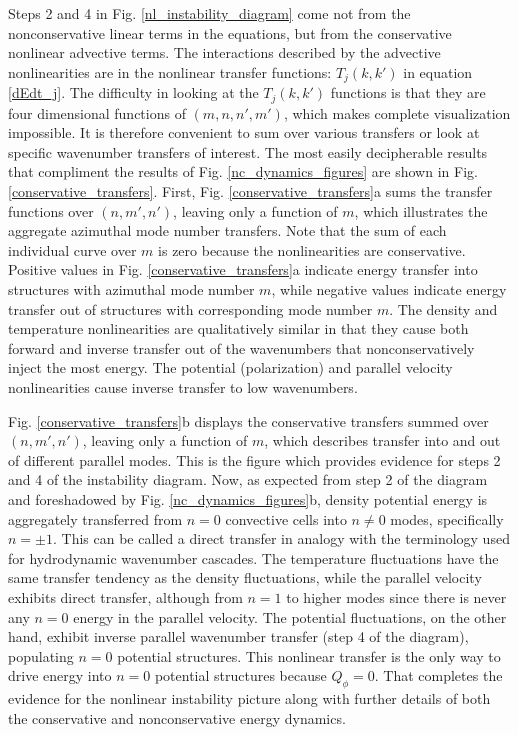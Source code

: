 \documentclass[showpacs,preprintnumbers,amsmath,amssymb,superscriptaddress]{revtex4}
\begin{document}
Steps 2 and 4 in Fig. \ref{nl_instability_diagram} come not from the nonconservative linear terms in the equations, but from the conservative nonlinear advective terms.
The interactions described by the advective nonlinearities are in the nonlinear transfer functions: $T_{j}(k,k')$ in equation \ref{dEdt_j}.
The difficulty in looking at the $T_{j}(k,k')$ functions is that they are four dimensional functions of $(m,n,n',m')$, 
which makes complete visualization impossible. It is therefore convenient to sum over various transfers or look at specific wavenumber transfers of interest. The most easily decipherable
results that compliment the results of Fig. \ref{nc_dynamics_figures} are shown in Fig. \ref{conservative_transfers}. First, Fig. \ref{conservative_transfers}a sums the transfer functions over
$(n,m',n')$, leaving only a function of $m$, which illustrates the aggregate azimuthal mode
number transfers. Note that the sum of each individual curve over $m$ is zero because the nonlinearities are conservative. Positive values in Fig. \ref{conservative_transfers}a
indicate energy transfer into structures with azimuthal mode number $m$, while negative values indicate energy transfer out of structures with corresponding mode number $m$. 
The density and temperature nonlinearities
are qualitatively similar in that they cause both forward and inverse transfer out of the wavenumbers that nonconservatively inject the most energy. The potential (polarization) and parallel velocity 
nonlinearities cause inverse transfer to low wavenumbers. 

Fig. \ref{conservative_transfers}b displays the conservative transfers summed over $(n,m',n')$, leaving only a function of $m$, which describes transfer into and out
of different parallel modes. This is the figure which provides evidence for steps 2 and 4 of the instability diagram.
Now, as expected from step 2 of the diagram and foreshadowed by Fig. \ref{nc_dynamics_figures}b, 
density potential energy is aggregately transferred from $n=0$ convective cells into $n \ne 0$ modes, specifically $n = \pm 1$. This can be called a direct
transfer in analogy with the terminology used for hydrodynamic wavenumber cascades. The temperature fluctuations have the same transfer tendency 
as the density fluctuations, while the parallel velocity exhibits direct transfer, although from $n=1$ to higher modes since there is never any $n=0$ energy in the parallel velocity.
The potential fluctuations, on the other hand, exhibit inverse parallel wavenumber transfer (step 4 of the diagram),
populating $n=0$ potential structures. This nonlinear transfer is the only way to drive energy into
$n=0$ potential structures because $Q_\phi=0$. That completes the evidence for the nonlinear instability picture along with further details of both the conservative and nonconservative energy dynamics.
\end{document}
